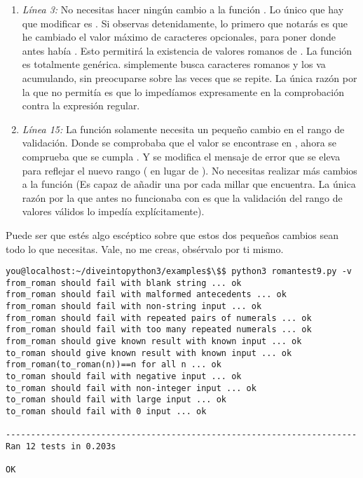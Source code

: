 \begin{enumerate}

\item \emph{Línea 3:} No necesitas hacer ningún cambio a la función . Lo único que hay que modificar es . Si observas detenidamente, lo primero que notarás es que he cambiado el valor máximo de caracteres  opcionales, para poner  donde antes había . Esto permitirá la existencia de valores romanos de . La función  es totalmente genérica. simplemente busca caracteres romanos y los va acumulando, sin preocuparse sobre las veces que se repite. La única razón por la que no permitía  es que lo impedíamos expresamente en la comprobación contra la expresión regular.

\item \emph{Línea 15:} La función  solamente necesita un pequeño cambio en el rango de validación. Donde se comprobaba que el valor se encontrase en , ahora se comprueba que se cumpla . Y se modifica el mensaje de error que se eleva para reflejar el nuevo rango ( en lugar de ). No necesitas realizar más cambios a la función (Es capaz de añadir una  por cada millar que encuentra. La única razón por la que antes no funcionaba con  es que la validación del rango de valores válidos lo impedía explícitamente).

\end{enumerate}

Puede ser que estés algo escéptico sobre que estos dos pequeños cambios sean todo lo que necesitas. Vale, no me creas, obsérvalo por ti mismo.

\noindent\begin{minipage}{\textwidth}
\begin{lstlisting}[mathescape=True]
you@localhost:~/diveintopython3/examples$\$$ python3 romantest9.py -v
from_roman should fail with blank string ... ok
from_roman should fail with malformed antecedents ... ok
from_roman should fail with non-string input ... ok
from_roman should fail with repeated pairs of numerals ... ok
from_roman should fail with too many repeated numerals ... ok
from_roman should give known result with known input ... ok
to_roman should give known result with known input ... ok
from_roman(to_roman(n))==n for all n ... ok
to_roman should fail with negative input ... ok
to_roman should fail with non-integer input ... ok
to_roman should fail with large input ... ok
to_roman should fail with 0 input ... ok

----------------------------------------------------------------------
Ran 12 tests in 0.203s

OK
\end{lstlisting}
\end{minipage}

